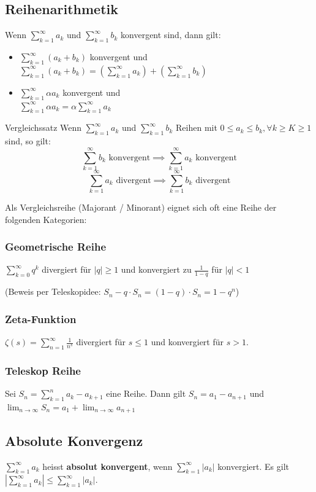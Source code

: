 \documentclass[a4paper,fontsize = 7pt]{scrartcl}
\def\limn{\lim_{n\to \infty}}
\def\sumk{\sum_{k=1}^\infty}
\begin{document}
\subsection{Reihenarithmetik}
Wenn $\sumk a_k$ und $\sumk b_k$ konvergent sind, dann gilt:
\begin{itemize}
 \item $\sumk (a_k + b_k)$ konvergent und $\sumk (a_k + b_k) = \left( \sumk a_k \right) + \left( \sumk b_k \right)$
 \item $\sumk \alpha a_k$ konvergent und \\$\sumk \alpha a_k = \alpha \sumk a_k$
\end{itemize}


\begin{mainbox}{Vergleichssatz}
  \vspace{-4pt}
Wenn $\sumk a_k$ und $\sumk b_k$ Reihen mit $0 \le a_k \le b_k, \forall k \ge K \ge 1$ sind, so gilt:
$$\sumk b_k \text{ konvergent} \implies \sumk a_k \text{ konvergent}$$ 
$$\sumk a_k \text{ divergent} \implies \sumk b_k \text{ divergent}$$ 
  \vspace{-12pt}
\end{mainbox}

Als Vergleichsreihe (Majorant / Minorant) eignet sich oft eine Reihe der folgenden Kategorien:
\subsubsection{Geometrische Reihe} 
$\sum_{k=0}^\infty q^k$ divergiert für $|q| \ge 1$ und konvergiert zu $\frac{1}{1 - q}$ für $|q| < 1$

(Beweis per Teleskopidee: $S_n - q \cdot S_n = (1-q) \cdot S_n = 1 - q^n$)
\subsubsection{Zeta-Funktion}
$\zeta(s) = \sum_{n=1}^\infty \frac{1}{n^s}$ divergiert für $s \le 1$ und konvergiert für $s > 1$.
\subsubsection{Teleskop Reihe}
Sei $S_n = \sum_{k=1}^{n} a_k - a_{k+1}$ eine Reihe. Dann gilt $S_n = a_1 - a_{n+1}$ und $\limn S_n = a_1 + \limn a_{n+1}$


\subsection{Absolute Konvergenz}
$\sumk a_k$ heisst \textbf{absolut konvergent}, wenn $\sumk |a_k|$ konvergiert. Es gilt $|\sumk a_k| \le \sumk |a_k|$.
\end{document}
